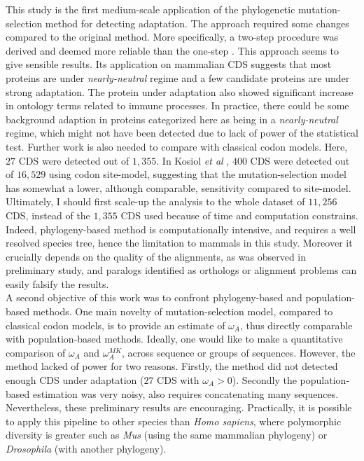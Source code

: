 This study is the first medium-scale application of the phylogenetic mutation-selection method for detecting adaptation. The approach required some changes compared to the original method. More specifically, a two-step procedure was derived and deemed more reliable than the one-step \citet{lartillot_phylobayes_2013}. This approach seems to give sensible results. Its application on mammalian CDS suggests that most proteins are under \textit{nearly-neutral} regime and a few candidate proteins are under strong adaptation. The protein under adaptation also showed significant increase in ontology terms related to immune processes. In practice, there could be some background adaption in proteins categorized here as being in a \textit{nearly-neutral} regime, which might not have been detected due to lack of power of the statistical test. Further work is also needed to compare with classical codon models. Here, $27$ CDS were detected out of $1,355$. In Kosiol \textit{et al} \citet{kosiol_patterns_2008}, $400$ CDS were detected out of $16,529$ using codon site-model, suggesting that the mutation-selection model has somewhat a lower, although comparable, sensitivity compared to site-model. Ultimately, I should first scale-up the analysis to the whole dataset of $11,256$ CDS, instead of the $1,355$ CDS used because of time and computation constrains. Indeed, phylogeny-based method is computationally intensive, and requires a well resolved species tree, hence the limitation to mammals in this study. Moreover it crucially depends on the quality of the alignments, as was observed in preliminary study, and paralogs identified as orthologs or alignment problems can easily falsify the results.\\

A second objective of this work was to confront phylogeny-based and population-based methods. One main novelty of mutation-selection model, compared to classical codon models, is to provide an estimate of $\omega_A$, thus directly comparable with population-based methods. Ideally, one would like to make a quantitative comparison of $\omega_A$ and $\omega_A^{MK}$, across sequence or groups of sequences. However, the method lacked of power for two reasons. Firstly, the method did not detected enough CDS under adaptation ($27$ CDS with $\omega_A > 0$). Secondly the population-based estimation was very noisy, also requires concatenating many sequences. Nevertheless, these preliminary results are encouraging. Practically, it is possible to apply this pipeline to other species than \textit{Homo sapiens}, where polymorphic diversity is greater such as \textit{Mus} (using the same mammalian phylogeny) or \textit{Drosophila} (with another phylogeny). \\

